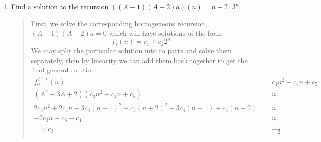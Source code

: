 \documentclass[letter]{article}
\begin{document}
\begin{enumerate}
		\newpage
        \item 
        Find a solution to the recursion $((A - 1)(A - 2)a)(n) = n + 2 \cdot 3^n$.
		\begin{quote}
	        First, we solve the corresponding homogeneous recursion, $(A - 1)(A - 2)a =0$ which will have solutions of the form 
	        \[
	            f_1(n) = c_1 + c_2 2^n 
	        \]
	        We may split the particular solution into to parts and solve them separately, then by linearity we can add them back together to get the final general solution. 
            \begin{align*}
                f_0^{(1)}(n) &= c_3n^2 +c_4n + c_5 \\
                (A^2 - 3A + 2)(c_3n^2 +c_4n + c_5) &= n\\
                2 c_3 n^2 + 2 c_4 n - 3 c_3 (n + 1)^2 + c_3 (n + 2)^2 - 3 c_4 (n + 1) + c_4 (n + 2) &= n \\
                -2 c_3 n + c_3 - c_4 &= n \\
                \implies c_3 &= -\frac{1}{2} \\ 

\end{align*}
\end{quote}
\end{enumerate}
\end{document}
